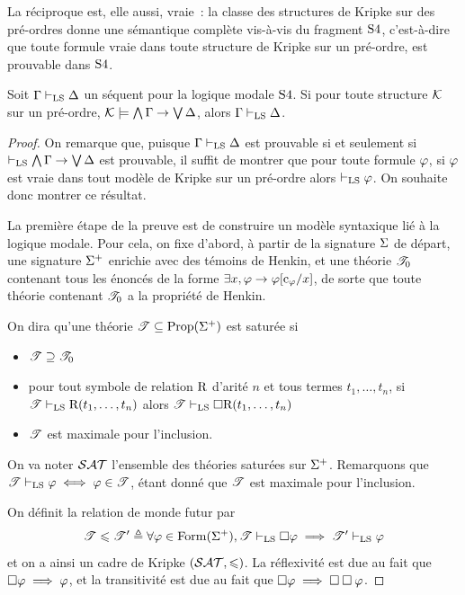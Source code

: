 La réciproque est, elle aussi, vraie~: la classe des structures de Kripke sur
des pré-ordres donne une sémantique complète vis-à-vis du fragment $\mathrm{S}4$,
c'est-à-dire que toute formule vraie dans toute structure de Kripke sur
un pré-ordre, est prouvable dans $\mathrm{S}4$.

\begin{theorem}
  Soit $\Gamma\vdash_{\operatorname{LS}}\Delta$ un séquent pour la logique modale $\mathrm{S}4$. Si pour
  toute structure $\mathcal{K}$ sur un pré-ordre,
  $\mathcal{K}\models \bigwedge\Gamma \to \bigvee\Delta$, alors
  $\Gamma\vdash_{\operatorname{LS}}\Delta$.
\end{theorem}

\begin{proof}
  On remarque que, puisque $\Gamma\vdash_{\operatorname{LS}}\Delta$ est prouvable si et seulement si
  $\vdash_{\operatorname{LS}}\bigwedge\Gamma\to\bigvee\Delta$ est prouvable, il suffit de montrer
  que pour toute formule $\varphi$, si $\varphi$ est vraie dans tout modèle de
  Kripke sur un pré-ordre alors $\vdash_{\operatorname{LS}}\varphi$. On souhaite donc montrer ce
  résultat.
  
  La première étape de la preuve est de construire un modèle syntaxique lié à
  la logique modale. Pour cela, on fixe d'abord, à partir de la signature
  $\Sigma$ de départ, une signature $\Sigma^+$ enrichie avec des témoins de
  Henkin, et une théorie $\mathscr T_0$ contenant tous les énoncés de la forme
  $\exists x,\varphi \to \varphi[\mathrm{c}_\varphi/x]$, de sorte que toute théorie
  contenant $\mathscr T_0$ a la propriété de Henkin.

  On dira qu'une théorie $\mathscr T \subseteq\operatorname{Prop}(\Sigma^+)$ est saturée si
  \begin{itemize}
  \item $\mathscr T\supseteq\mathscr T_0$
  \item pour tout symbole de relation $\mathrm{R}$ d'arité $n$ et tous
    termes $t_1,\ldots,t_n$, si
    $\mathscr T \vdash_{\operatorname{LS}} \mathrm{R}(t_1,\ldots,t_n)$ alors
    $\mathscr T\vdash_{\operatorname{LS}}\mathbin{\square} \mathrm{R}(t_1,\ldots,t_n)$
  \item $\mathscr T$ est maximale pour l'inclusion.
  \end{itemize}
  On va noter $\mathcal{SAT}$ l'ensemble des théories saturées sur $\Sigma^+$.
  Remarquons que $\mathscr T \vdash_{\operatorname{LS}}\varphi \iff \varphi \in \mathscr T$, étant donné
  que $\mathscr T$ est maximale pour l'inclusion.

  On définit la relation de monde futur par
  \[\mathscr T \leqslant \mathscr T' \triangleq
  \forall \varphi \in \operatorname{Form}(\Sigma^+), \mathscr T \vdash_{\operatorname{LS}}\mathbin{\square}\varphi
  \implies \mathscr T'\vdash_{\operatorname{LS}}\varphi\]
  et on a ainsi un cadre de Kripke $(\mathcal{SAT},\leqslant)$. La réflexivité est due au
  fait que $\mathbin{\square}\varphi\implies \varphi$, et la transitivité est due au fait
  que $\mathbin{\square}\varphi\implies\mathbin{\square}\mathbin{\square}\varphi$.


\end{proof}
